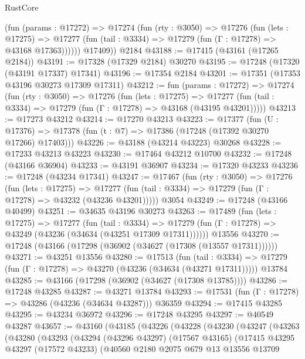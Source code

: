 \begin{lexlean}{RustCore}
\begin{coremodule}
          (fun (params : @17272) =>
          @17274
            (fun (rty : @3050) =>
            @17276
              (fun (lets : @17275) =>
              @17277 (fun (tail : @3334) => @17279 (fun (Γ : @17278) => @43168 @17363))))))
        @17409))
    @2184
@43188 := @17415 (@43161 (@17265 @2184))
@43191 := @17328 (@17329 @2184) @30270
@43195 := @17248 (@17320 (@43191 @17337) @17341)
@43196 := @17354 @2184
@43201 := @17351 (@17353 @43196 @30273 @17309 @17311)
@43212 := fun (params : @17272) =>
  @17274
    (fun (rty : @3050) =>
    @17276
      (fun (lets : @17275) =>
      @17277 (fun (tail : @3334) => @17279 (fun (Γ : @17278) => @43168 (@43195 @43201)))))
@43213 := @17273 @43212
@43214 := @17270 @43213
@43223 := @17377
    (fun (U : @17376) => @17378 (fun (t : @7) => @17386 (@17248 (@17392 @30270 @17266) @17403)))
@43226 := @43188 (@43214 @43223) @30268
@43228 := @17233 @43213 @43223
@43230 := @17464 @43212 @10700
@43232 := @17248 (@43166 @36904)
@43233 := @43191 @36907
@43234 := @17320 @43233
@43236 := @17248 (@43234 @17341)
@43247 := @17467
    (fun (rty : @3050) =>
    @17276
      (fun (lets : @17275) =>
      @17277 (fun (tail : @3334) => @17279 (fun (Γ : @17278) => @43232 (@43236 @43201)))))
    @3054
@43249 := @17248 (@43166 @40499)
@43251 := @34635 @43196 @30273
@43263 := @17489
    (fun (lets : @17275) =>
    @17277
      (fun (tail : @3334) =>
      @17279 (fun (Γ : @17278) => @43249 (@43236 (@34634 (@43251 @17309 @17311))))))
    @13556
@43270 := @17248 (@43166 (@17298 (@36902 (@34627 (@17308 (@13557 @17311))))))
@43271 := @43251 @13556
@43280 := @17513
    (fun (tail : @3334) => @17279 (fun (Γ : @17278) => @43270 (@43236 (@34634 (@43271 @17311)))))
    @13784
@43285 := @43166 (@17298 (@36902 (@34627 (@17308 @13785))))
@43286 := @17248 @43285
@43287 := @43271 @13784
@43293 := @17531 (fun (Γ : @17278) => @43286 (@43236 (@34634 @43287))) @36359
@43294 := @17415 @43285
@43295 := @43234 @36972
@43296 := @17248 @43295
@43297 := @40549 @43287
@43657 := @43160
    (@43185
      (@43226
        (@43228
          (@43230
            (@43247
              (@43263
                (@43280
                  (@43293
                    (@43294
                      (@43296 @43297)
                      (@17567 @43165)
                      (@17415
                        @43295
                        @43297
                        (@17572 @43233)
                        (@40560
                          @2180
                          @2075
                          @679
                          @13
                          @13556
                          @13709

\end{coremodule}
\end{lexlean}
